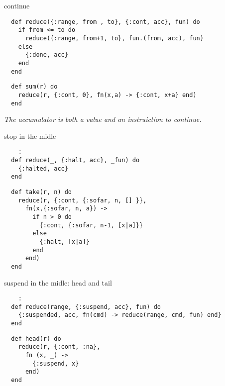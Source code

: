\begin{frame}[fragile]{continue}

\begin{verbatim}
  def reduce({:range, from , to}, {:cont, acc}, fun) do
    if from <= to do
      reduce({:range, from+1, to}, fun.(from, acc), fun)
    else
      {:done, acc}
    end
  end
\end{verbatim}

  \vspace{20pt}\pause
  
\begin{verbatim}
  def sum(r) do
    reduce(r, {:cont, 0}, fn(x,a) -> {:cont, x+a} end)
  end
\end{verbatim}

  \vspace{10pt}\pause
  {\em The accumulator is both a value and an instruiction to continue.}
  
\end{frame}

\begin{frame}[fragile]{stop in the midle}

\begin{verbatim}
    :
  def reduce(_, {:halt, acc}, _fun) do
    {:halted, acc}
  end
\end{verbatim}

\vspace{20pt}\pause
\begin{verbatim}
  def take(r, n) do
    reduce(r, {:cont, {:sofar, n, [] }},
      fn(x,{:sofar, n, a}) ->
        if n > 0 do
          {:cont, {:sofar, n-1, [x|a]}}
        else
          {:halt, [x|a]}
        end
      end)
  end    
\end{verbatim}
  
\end{frame}





\begin{frame}[fragile]{suspend in the midle:  head and tail }

  
\begin{verbatim}
    :
  def reduce(range, {:suspend, acc}, fun) do
    {:suspended, acc, fn(cmd) -> reduce(range, cmd, fun) end}
  end
\end{verbatim}
  \pause


\begin{verbatim}
  def head(r) do
    reduce(r, {:cont, :na},
      fn (x, _) ->
        {:suspend, x}
      end)
  end
\end{verbatim}
  
\end{frame}

